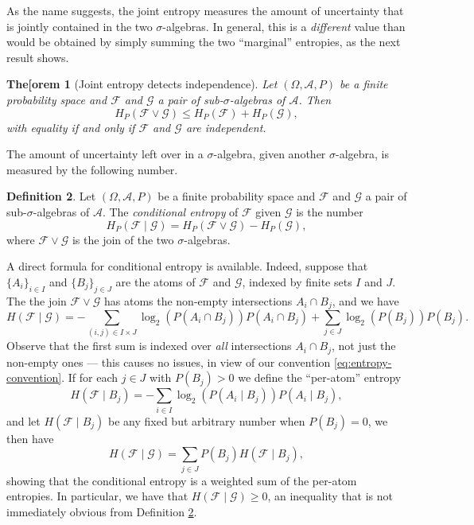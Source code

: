 \documentclass[11pt]{book}
\newtheorem{thm}{The[orem}[section]
\theoremstyle{definition}
\newtheorem{defn}[thm]{Definition}
\numberwithin{equation}{section}
\begin{document}
As the name suggests, the joint entropy measures the amount of uncertainty that is jointly contained in the two $\sigma$-algebras. In general, this is a \textit{different} value than would be obtained by simply summing the two ``marginal'' entropies, as the next result shows.

\begin{thm}[Joint entropy detects independence]\label{thm:joint-entropy-ineq}
	Let $(\Omega,\mathcal{A},P)$ be a finite probability space and $\mathcal{F}$ and $\mathcal{G}$ a pair of sub-$\sigma$-algebras of $\mathcal{A}$. Then
	\[
		H_P(\mathcal{F} \vee \mathcal{G}) \leq H_P(\mathcal{F}) + H_P(\mathcal{G}),
	\]
	with equality if and only if $\mathcal{F}$ and $\mathcal{G}$ are independent.
\end{thm}

The amount of uncertainty left over in a $\sigma$-algebra, given another $\sigma$-algebra, is measured by the following number.

\begin{defn}\label{defn:conditional-entropy}
	Let $(\Omega,\mathcal{A},P)$ be a finite probability space and $\mathcal{F}$ and $\mathcal{G}$ a pair of sub-$\sigma$-algebras of $\mathcal{A}$. The \textit{conditional entropy} of $\mathcal{F}$ given $\mathcal{G}$ is the number
	\[
		H_P(\mathcal{F} \mid \mathcal{G}) = H_P(\mathcal{F} \vee \mathcal{G}) - H_P(\mathcal{G}),
	\]
	where $\mathcal{F}\vee \mathcal{G}$ is the join of the two $\sigma$-algebras.
\end{defn}

A direct formula for conditional entropy is available. Indeed, suppose that $\{A_i\}_{i\in I}$ and $\{B_j\}_{j\in J}$ are the atoms of $\mathcal{F}$ and $\mathcal{G}$, indexed by finite sets $I$ and $J$. The the join $\mathcal{F} \vee \mathcal{G}$ has atoms the non-empty intersections $A_i \cap B_j$, and we have
\[
	H(\mathcal{F} \mid \mathcal{G}) = -\sum_{(i,j) \in I \times J} \log_2{\left( P(A_i \cap B_j) \right)} P(A_i \cap B_j)  + \sum_{j\in J} \log_2{\left( P(B_j) \right)} P(B_j).
\]
Observe that the first sum is indexed over \textit{all} intersections $A_i \cap B_j$, not just the non-empty ones — this causes no issues, in view of our convention \eqref{eq:entropy-convention}. If for each $j\in J$ with $P(B_j) > 0$ we define the ``per-atom'' entropy
\[
	H(\mathcal{F} \mid B_j) = - \sum_{i\in I} \log_2{\left( P(A_i \mid B_j) \right)} P(A_i \mid B_j),
\]
and let $H(\mathcal{F} \mid B_j)$ be any fixed but arbitrary number when $P(B_j) =0$, we then have
\[
	H(\mathcal{F} \mid \mathcal{G}) = \sum_{j\in J} P(B_j) H(\mathcal{F} \mid B_j),
\]
showing that the conditional entropy is a weighted sum of the per-atom entropies. In particular, we have that $H(\mathcal{F} \mid \mathcal{G})\geq 0$, an inequality that is not immediately obvious from Definition \ref{defn:conditional-entropy}.
\end{document}
